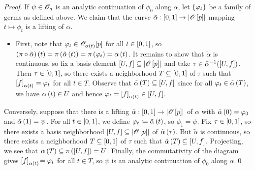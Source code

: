 \documentclass[../Moduli_Spaces_of_Riemann_Surfaces.tex]{subfiles}
\begin{document}
    \begin{proof}
        If $\psi\in\mathscr{O}_q$ is an analytic continuation of $\phi_0$ along $\alpha$, let $\left\{\varphi_t\right\}$ be a family of germs as defined above. We claim that the curve $\tilde{\alpha}:\left[0,1\right]\to\left|\mathscr{O}\left[p\right]\right|$ mapping $t\mapsto\phi_t$ is a lifting of $\alpha$.
        \begin{itemize}
            \item First, note that $\varphi_t\in\mathscr{O}_{\alpha\left(t\right)}\!\left[p\right]$ for all $t\in\left[0,1\right]$, so $\left(\pi\circ\tilde{\alpha}\right)\left(t\right)=\pi\left(\tilde{\alpha}\left(t\right)\right)=\pi\left(\varphi_t\right)=\alpha\left(t\right)$. It remains to show that $\tilde{\alpha}$ is continuous, so fix a basis element $\left[U,f\right]\subseteq\left|\mathscr{O}\left[p\right]\right|$ and take $\tau\in\tilde{\alpha}^{-1}\!\left(\left[U,f\right]\right)$. Then $\tau\in\left[0,1\right]$, so there exists a neighborhood $T\subseteq\left[0,1\right]$ of $\tau$ such that $\left[f\right]_{\alpha\left(t\right)}=\varphi_t$ for all $t\in T$. Observe that $\tilde{\alpha}\left(T\right)\subseteq\left[U,f\right]$ since for all $\varphi_t\in\tilde{\alpha}\left(T\right)$, we have $\alpha\left(t\right)\in U$ and hence $\varphi_t=\left[f\right]_{\alpha\left(t\right)}\in\left[U,f\right]$.
        \end{itemize}
        Conversely, suppose that there is a lifting $\tilde{\alpha}:\left[0,1\right]\to\left|\mathscr{O}\left[p\right]\right|$ of $\alpha$ with $\tilde{\alpha}\left(0\right)=\varphi_0$ and $\tilde{\alpha}\left(1\right)=\psi$. For all $t\in\left[0,1\right]$, we define $\varphi_t\coloneqq\tilde{\alpha}\left(t\right)$, so $\phi_1=\psi$. Fix $\tau\in\left[0,1\right]$, so there exists a basis neighborhood $\left[U,f\right]\subseteq\left|\mathscr{O}\left[p\right]\right|$ of $\tilde{\alpha}\left(\tau\right)$. But $\tilde{\alpha}$ is continuous, so there exists a neighborhood $T\subseteq\left[0,1\right]$ of $\tau$ such that $\tilde{\alpha}\left(T\right)\subseteq\left[U,f\right]$. Projecting, we see that $\alpha\left(T\right)\subseteq\pi\left(\left[U,f\right]\right)=U$. Finally, the commutativity of the diagram gives $\left[f\right]_{\alpha\left(t\right)}\!=\varphi_t$ for all $t\in T$, so $\psi$ is an analytic continuation of $\phi_0$ along $\alpha$.\qed
    \end{proof}
\end{document}
